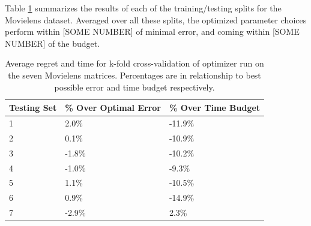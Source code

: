 Table \ref{fig:MovieCrossTable} summarizes the results of each of the 
training/testing splits for the Movielens dataset. Averaged over 
all these splits, the optimized parameter choices perform within 
[SOME NUMBER] of minimal error, and coming 
within [SOME NUMBER] of the budget.

\begin{table}
\label{fig:MovieCrossTable}
\begin{center}
    \begin{tabular}{| p{2.2cm} | p{2.2cm} | p{2.2cm} |}
    \hline
    Testing Set & \% Over Optimal Error & \% Over Time Budget \\ \hline
    1 & 2.0\% & -11.9\% \\ \hline
    2 & 0.1\% & -10.9\% \\ \hline
    3 & -1.8\% & -10.2\% \\ \hline
    4 & -1.0\% & -9.3\% \\ \hline
    5 & 1.1\% & -10.5\% \\ \hline
    6 & 0.9\% & -14.9\% \\ \hline
    7 & -2.9\% & 2.3\% \\ \hline
    \end{tabular}
\end{center}
\caption{Average regret and time for k-fold cross-validation of optimizer run on the seven Movielens matrices. Percentages are in relationship to best possible error and time budget respectively.}
\end{table}

